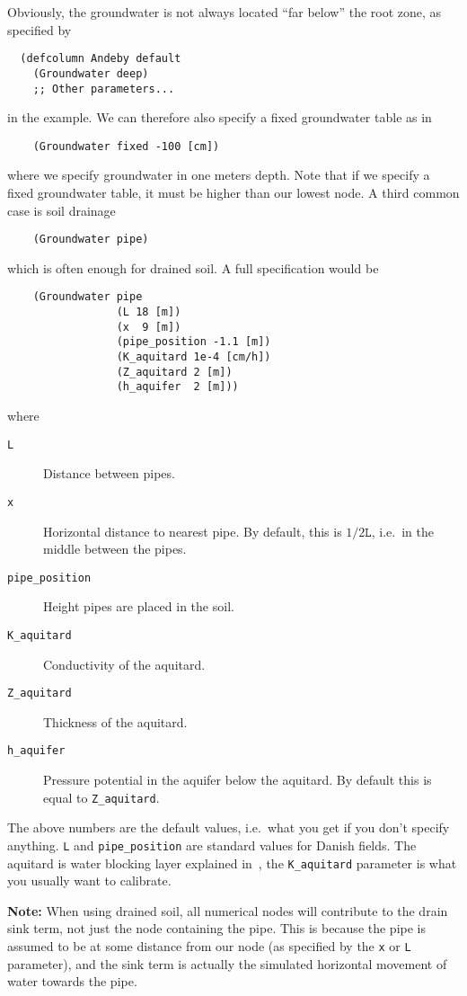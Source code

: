 \documentclass[a4paper]{article}
\begin{document}
Obviously, the groundwater is not always located ``far below'' the
root zone, as specified by
\begin{verbatim}
  (defcolumn Andeby default
    (Groundwater deep)
    ;; Other parameters...
\end{verbatim}
in the example.  We can therefore also specify a fixed groundwater
table as in
\begin{verbatim}
    (Groundwater fixed -100 [cm])
\end{verbatim}
where we specify groundwater in one meters depth.  Note that if we
specify a fixed groundwater table, it must be higher than our lowest
node.  A third common case is soil drainage
\begin{verbatim}
    (Groundwater pipe)
\end{verbatim}
which is often enough for drained soil.  A full specification would be
\begin{verbatim}
    (Groundwater pipe
                 (L 18 [m])
                 (x  9 [m])
                 (pipe_position -1.1 [m])
                 (K_aquitard 1e-4 [cm/h])
                 (Z_aquitard 2 [m])
                 (h_aquifer  2 [m]))
\end{verbatim}
where
\begin{description}
\item[\texttt{L}] Distance between pipes.
\item[\texttt{x}] Horizontal distance to nearest pipe. By default,
  this is $1/2 \mathtt{L}$, i.e.\ in the middle between the pipes.
\item[\texttt{pipe\_position}] Height pipes are placed in the soil.
\item[\texttt{K\_aquitard}] Conductivity of the aquitard.
\item[\texttt{Z\_aquitard}] Thickness of the aquitard.
\item[\texttt{h\_aquifer}] Pressure potential in the aquifer below the
  aquitard. By default this is equal to \texttt{Z\_aquitard}.
\end{description}
The above numbers are the default values, i.e.\ what you get if you
don't specify anything.  \texttt{L} and \texttt{pipe\_position} are
standard values for Danish fields.  The aquitard is water blocking
layer explained in~\cite{daisy-new}, the \texttt{K\_aquitard}
parameter is what you usually want to calibrate.

\textbf{Note:} When using drained soil, all numerical nodes will
contribute to the drain sink term, not just the node containing the
pipe.  This is because the pipe is assumed to be at some distance from
our node (as specified by the \texttt{x} or \texttt{L} parameter), and
the sink term is actually the simulated horizontal movement of water
towards the pipe.
\end{document}
